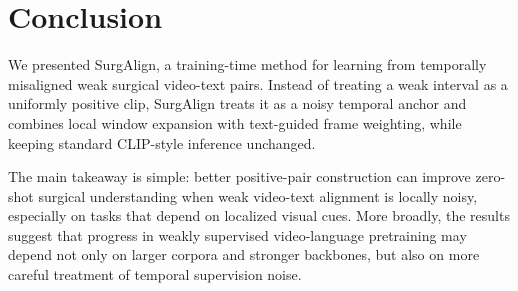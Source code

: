 \section{Conclusion}
\label{sec:conclusion}

We presented SurgAlign, a training-time method for learning from temporally misaligned weak surgical video-text pairs. Instead of treating a weak interval as a uniformly positive clip, SurgAlign treats it as a noisy temporal anchor and combines local window expansion with text-guided frame weighting, while keeping standard CLIP-style inference unchanged.

The main takeaway is simple: better positive-pair construction can improve zero-shot surgical understanding when weak video-text alignment is locally noisy, especially on tasks that depend on localized visual cues. More broadly, the results suggest that progress in weakly supervised video-language pretraining may depend not only on larger corpora and stronger backbones, but also on more careful treatment of temporal supervision noise.
